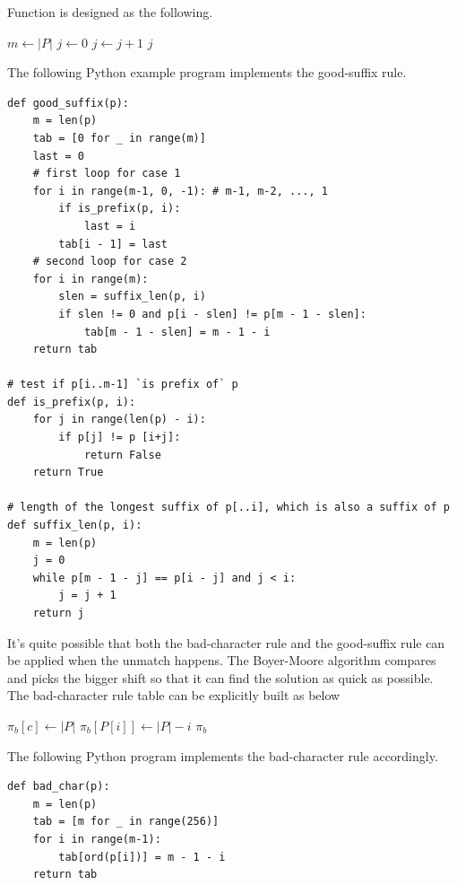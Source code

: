 \documentclass[UTF8]{article}
\begin{document}
Function  is designed as the following.

\begin{algorithmic}[1]
  \State $m \gets |P|$
  \State $j \gets 0$
    \State $j \gets j + 1$
  \EndWhile
  \State \Return $j$
\EndFunction
\end{algorithmic}

The following Python example program implements the good-suffix rule.

\lstset{language=Python}
\begin{lstlisting}
def good_suffix(p):
    m = len(p)
    tab = [0 for _ in range(m)]
    last = 0
    # first loop for case 1
    for i in range(m-1, 0, -1): # m-1, m-2, ..., 1
        if is_prefix(p, i):
            last = i
        tab[i - 1] = last
    # second loop for case 2
    for i in range(m):
        slen = suffix_len(p, i)
        if slen != 0 and p[i - slen] != p[m - 1 - slen]:
            tab[m - 1 - slen] = m - 1 - i
    return tab

# test if p[i..m-1] `is prefix of` p
def is_prefix(p, i):
    for j in range(len(p) - i):
        if p[j] != p [i+j]:
            return False
    return True

# length of the longest suffix of p[..i], which is also a suffix of p
def suffix_len(p, i):
    m = len(p)
    j = 0
    while p[m - 1 - j] == p[i - j] and j < i:
        j = j + 1
    return j
\end{lstlisting}

It's quite possible that both the bad-character rule and the good-suffix rule can be applied
when the unmatch happens. The Boyer-Moore algorithm compares and picks the bigger shift
so that it can find the solution as quick as possible. The bad-character rule table can
be explicitly built as below

\begin{algorithmic}[1]
    \State $\pi_b[c] \gets |P|$
  \EndFor
    \State $\pi_b[P[i]] \gets |P| - i$
  \EndFor
  \State \Return $\pi_b$
\EndFunction
\end{algorithmic}

The following Python program implements the bad-character rule accordingly.

\lstset{language=Python}
\begin{lstlisting}
def bad_char(p):
    m = len(p)
    tab = [m for _ in range(256)]
    for i in range(m-1):
        tab[ord(p[i])] = m - 1 - i
    return tab
\end{lstlisting}
\end{document}
